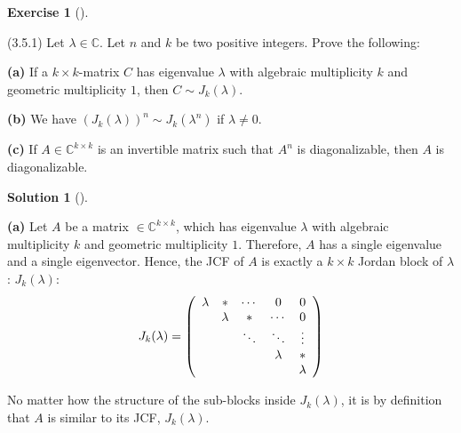 \documentclass[numbers=enddot,12pt,final,onecolumn,notitlepage]{scrartcl}
\newcounter{exer}
\newcounter{sol}
\theoremstyle{definition}
\newtheorem{exmp}[exer]{Exercise}
\newenvironment{exercise}[1][]
{\begin{exmp}[#1]\begin{leftbar}}
        {\end{leftbar}\end{exmp}}
\newtheorem{solu}[sol]{Solution}
\newenvironment{solution}[1][]
{\begin{solu}[#1]\begin{leftbar}}
        {\end{leftbar}\end{solu}}
\begin{document}
\begin{exercise}
	 (3.5.1) Let $\lambda\in\mathbb{C}$. Let $n$ and $k$ be two positive integers.
	Prove the following: \medskip

	\textbf{(a)} If a $k\times k$-matrix $C$ has eigenvalue $\lambda$ with
	algebraic multiplicity $k$ and geometric multiplicity $1$, then $C\sim
		J_{k}\left(  \lambda\right)  $. \medskip

	\textbf{(b)} We have $\left(  J_{k}\left(  \lambda\right)  \right)  ^{n}\sim
		J_{k}\left(  \lambda^{n}\right)  $ if $\lambda\neq0$. \medskip

	\textbf{(c)} If $A\in\mathbb{C}^{k\times k}$ is an invertible matrix such that
	$A^{n}$ is diagonalizable, then $A$ is diagonalizable.
\end{exercise}

\begin{solution}
	\textbf{(a)} Let $A$ be a matrix $\in \mathbb{C}^{k \times k}$, which has eigenvalue $\lambda$ with algebraic multiplicity $k$ and geometric multiplicity $1$. Therefore, $A$ has a single eigenvalue and a single eigenvector. Hence,
	the JCF of $A$ is exactly a $k \times k$ Jordan block of $\lambda$: $J_k(\lambda)$:
	\[
		J_k(\lambda) =
		\left(
		\begin{array}[c]{ccccc}
				\lambda  & *        & \cdots   & 0        & 0       \\
				\text{ } & \lambda  & *        & \cdots   & 0       \\
				\text{ } & \text{ } & \ddots   & \ddots   & \vdots  \\
				\text{ } & \text{ } & \text{ } & \lambda  & *       \\
				\text{ } & \text{ } & \text{ } & \text{ } & \lambda
			\end{array}
		\right)
	\]

	No matter how the structure of the sub-blocks inside $J_k(\lambda)$, it is by definition that $A$ is similar to its JCF, $J_k(\lambda)$.


\end{solution}
\end{document}
